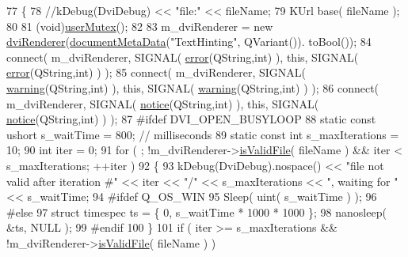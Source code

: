\begin{DoxyCode}
77 \{
78     \textcolor{comment}{//kDebug(DviDebug) << "file:" << fileName;}
79     KUrl base( fileName );
80 
81     (void)\hyperlink{classOkular_1_1Generator_a83d702cccbce2288c3258d97f1f15e19}{userMutex}();
82 
83     m\_dviRenderer = \textcolor{keyword}{new} \hyperlink{classdviRenderer}{dviRenderer}(\hyperlink{classOkular_1_1Generator_a450f3316a563dcf217fcebac4fa0328e}{documentMetaData}(\textcolor{stringliteral}{"TextHinting"}, QVariant()).
      toBool());
84     connect( m\_dviRenderer, SIGNAL( \hyperlink{classOkular_1_1Generator_a0f73eaeb88ccb1ecb73814a918244e03}{error}(QString,\textcolor{keywordtype}{int}) ), \textcolor{keyword}{this}, SIGNAL( 
      \hyperlink{classOkular_1_1Generator_a0f73eaeb88ccb1ecb73814a918244e03}{error}(QString,\textcolor{keywordtype}{int}) ) );
85     connect( m\_dviRenderer, SIGNAL( \hyperlink{classOkular_1_1Generator_aff0b69c430b30d0e0bf820015ba0a79d}{warning}(QString,\textcolor{keywordtype}{int}) ), \textcolor{keyword}{this}, SIGNAL( 
      \hyperlink{classOkular_1_1Generator_aff0b69c430b30d0e0bf820015ba0a79d}{warning}(QString,\textcolor{keywordtype}{int}) ) );
86     connect( m\_dviRenderer, SIGNAL( \hyperlink{classOkular_1_1Generator_a3a0ac65f0d61abbaa86b79b258bbe3b3}{notice}(QString,\textcolor{keywordtype}{int}) ), \textcolor{keyword}{this}, SIGNAL( 
      \hyperlink{classOkular_1_1Generator_a3a0ac65f0d61abbaa86b79b258bbe3b3}{notice}(QString,\textcolor{keywordtype}{int}) ) );
87 \textcolor{preprocessor}{#ifdef DVI\_OPEN\_BUSYLOOP}
88     \textcolor{keyword}{static} \textcolor{keyword}{const} ushort s\_waitTime = 800; \textcolor{comment}{// milliseconds}
89     \textcolor{keyword}{static} \textcolor{keyword}{const} \textcolor{keywordtype}{int} s\_maxIterations = 10;
90     \textcolor{keywordtype}{int} iter = 0;
91     \textcolor{keywordflow}{for} ( ; !m\_dviRenderer->\hyperlink{classdviRenderer_ac97838eefe7ae970c4cd462829267261}{isValidFile}( fileName ) && iter < s\_maxIterations; ++iter )
92     \{
93         kDebug(DviDebug).nospace() << \textcolor{stringliteral}{"file not valid after iteration #"} << iter << \textcolor{stringliteral}{"/"} << s\_maxIterations 
      << \textcolor{stringliteral}{", waiting for "} << s\_waitTime;
94 \textcolor{preprocessor}{#ifdef Q\_OS\_WIN}
95         Sleep( uint( s\_waitTime ) );
96 \textcolor{preprocessor}{#else}
97         \textcolor{keyword}{struct }timespec ts = \{ 0, s\_waitTime * 1000 * 1000 \};
98         nanosleep( &ts, NULL );
99 \textcolor{preprocessor}{#endif}
100     \}
101     \textcolor{keywordflow}{if} ( iter >= s\_maxIterations && !m\_dviRenderer->\hyperlink{classdviRenderer_ac97838eefe7ae970c4cd462829267261}{isValidFile}( fileName ) )

\end{DoxyCode}
